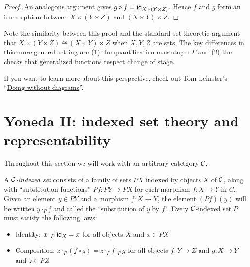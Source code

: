 \begin{proof}
  An analogous argument gives \(g \circ f = \mathsf{id}_{X\times (Y\times Z)}\).
  Hence \(f\) and \(g\) form an isomorphism
  between \(X \times (Y\times Z)\) and \((X\times Y) \times Z\).
\end{proof}
Note the similarity between this proof and the standard set-theoretic
argument that \(X \times (Y\times Z) \cong (X \times Y) \times Z\)
when \(X,Y,Z\) are sets.
The key differences in this more general setting are (1)
the quantification over stages \(\Gamma\)
and (2) the checks that generalized functions respect change of stage.

If you want to learn more about this perspective, check out
Tom Leinster's ``\href{https://webhomes.maths.ed.ac.uk/~tl/elements.pdf}{Doing without diagrams}''.

\chapter{Yoneda II: indexed set theory and representability}

Throughout this section we will work with an arbitrary catetgory \(\mathcal C\).

\begin{definition}
  A \emph{\(\mathcal C\)-indexed set}
  consists of a family of sets \(PX\) indexed by objects \(X\) of \(\mathcal C\),
  along with ``substitution functions'' \(Pf : PY \to PX\)
  for each morphism \(f : X \to Y\) in \(C\).
  Given an element \(y \in PY\)
  and a morphism \(f : X \to Y\),
  the element \((Pf)(y)\) will be written \(y \cdot_P f\)
  and called the ``substitution of \(y\) by \(f\)''.
  Every \(\mathcal C\)-indexed set \(P\)
  must satisfy the following laws:
  \begin{itemize}
  \item Identity: \(x \cdot_P \mathsf{id}_X = x\) for all objects \(X\) and \(x \in PX\)
  \item Composition: \(z \cdot_P (f\circ g) = z \cdot_P f \cdot_P g\)
    for all objects \(f : Y \to Z\) and \(g : X \to Y\) and \(z \in PZ\).
  \end{itemize}
\end{definition}

